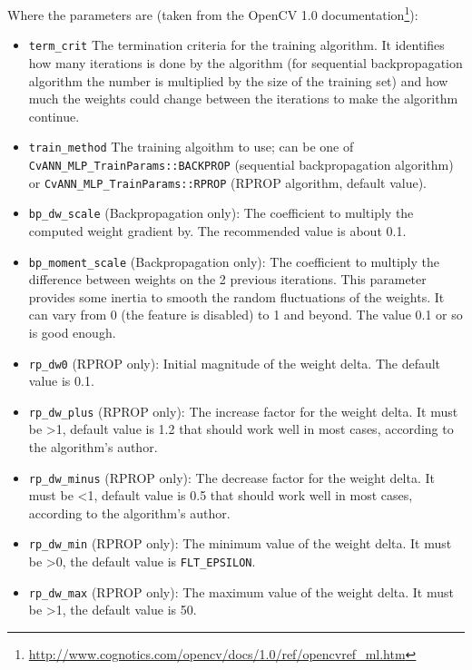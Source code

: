 Where the parameters are (taken from the OpenCV 1.0 documentation\footnote{\url{http://www.cognotics.com/opencv/docs/1.0/ref/opencvref_ml.htm}}):
\begin{itemize}

\item \lstinline|term_crit| The termination criteria for the training algorithm. It identifies how many iterations is done by the algorithm (for sequential backpropagation algorithm the number is multiplied by the size of the training set) and how much the weights could change between the iterations to make the algorithm continue. 

\item \lstinline|train_method| The training algoithm to use; can be one of \lstinline|CvANN_MLP_TrainParams::BACKPROP| (sequential backpropagation algorithm) or \lstinline|CvANN_MLP_TrainParams::RPROP| (RPROP algorithm, default value). 

\item \lstinline|bp_dw_scale|
    (Backpropagation only): The coefficient to multiply the computed weight gradient by. The recommended value is about 0.1.
\item \lstinline|bp_moment_scale|
    (Backpropagation only): The coefficient to multiply the difference between weights on the 2 previous iterations. This parameter provides some inertia to smooth the random fluctuations of the weights. It can vary from 0 (the feature is disabled) to 1 and beyond. The value 0.1 or so is good enough.
\item \lstinline|rp_dw0|
    (RPROP only): Initial magnitude of the weight delta. The default value is 0.1.
\item \lstinline|rp_dw_plus|
    (RPROP only): The increase factor for the weight delta. It must be >1, default value is 1.2 that should work well in most cases, according to the algorithm's author.
\item \lstinline|rp_dw_minus|
    (RPROP only): The decrease factor for the weight delta. It must be <1, default value is 0.5 that should work well in most cases, according to the algorithm's author.
\item \lstinline|rp_dw_min|
    (RPROP only): The minimum value of the weight delta. It must be >0, the default value is \lstinline|FLT_EPSILON|. 
\item \lstinline|rp_dw_max|
    (RPROP only): The maximum value of the weight delta. It must be >1, the default value is 50. 
\end{itemize}


